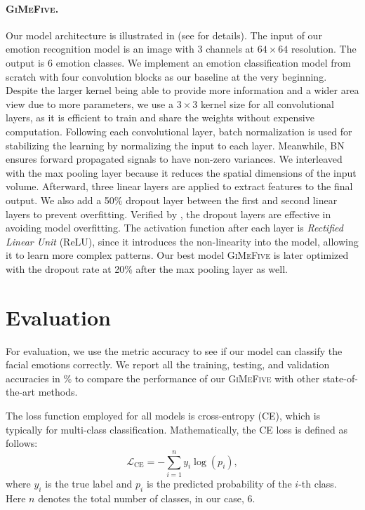 \paragraph{\textsc{GiMeFive}.}
Our model architecture is illustrated in  (see  for details). 
The input of our emotion recognition model is an image with 3 channels at $64 \times 64 $ resolution. 
The output is 6 emotion classes. %
We implement an emotion classification model from scratch with four convolution blocks as our baseline at the very beginning. 
Despite the larger kernel being able to provide more information and a wider area view due to more parameters, 
we use a $3 \times 3$ kernel size for all convolutional layers, 
as it is efficient to train and share the weights without expensive computation. 
Following each convolutional layer, 
batch normalization is used for stabilizing the learning by normalizing the input to each layer. 
Meanwhile, 
BN ensures forward propagated signals to have non-zero variances. 
We interleaved with the max pooling layer because it reduces the spatial dimensions of the input volume. 
Afterward, three linear layers are applied to extract features to the final output. 
We also add a 50\% dropout layer between the first and second linear layers to prevent overfitting. 
Verified by \citet{BarsoumZCZ16}, 
the dropout layers are effective in avoiding model overfitting. 
The activation function after each layer is \textit{Rectified Linear Unit} (ReLU), 
since it introduces the non-linearity into the model, 
allowing it to learn more complex patterns. 
Our best model \textsc{GiMeFive} is later optimized with the dropout rate at 20\% after the max pooling layer as well.

\section{Evaluation}
\label{sec:evaluation}

For evaluation, we use the metric accuracy to see if our model can classify the facial emotions correctly. 
We report all the training, testing, and validation accuracies in 
\% to compare the performance of our \textsc{GiMeFive} with other state-of-the-art methods. 

The loss function employed for all models is cross-entropy (CE), 
which is typically for multi-class classification. 
Mathematically, the CE loss is defined as follows: 
\begin{equation}
  \mathcal{L}_{\text{CE}} = -\sum_{i=1}^{n} y_i \log(p_i),
\end{equation}
where $y_i$ is the true label and $p_i$ is the predicted probability of the $i$-th class. 
Here $n$ denotes the total number of classes, in our case, 6.

